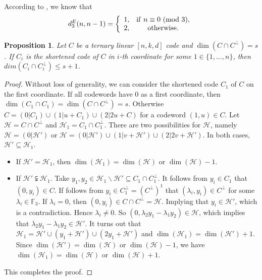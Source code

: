 \documentclass[12pt,twoside]{article}
\newcommand{\F}{\mathbb{F}}
\theoremstyle{plain}
\newtheorem{prop}[theorem]{Proposition}
\theoremstyle{definition}
\theoremstyle{remark}
\begin{document}
According to \cite{AH-TLCD-1-10}, we know that
$$d_3^E(n,n-1)=\left\{
  \begin{array}{cc}
    1,& {\rm if}\ n\equiv 0\ ({\rm mod}\ 3), \\
    2,& {\rm otherwise.} \\
  \end{array}
\right.$$

\begin{prop}\label{prop-ternary}
Let $C$ be a ternary linear $[n,k,d]$ code and $\dim(C\cap C^\perp)=s$. If $C_i$ is the shortened code of $C$ in $i$-th coordinate for some $1\in \{1,\ldots,n\}$, then $dim(C_i\cap C_i^\perp)\leq s+1$.
\end{prop}

\begin{proof}
Without loss of generality, we can consider the shortened code $C_1$ of $C$ on the first coordinate. If all codewords have $0$ as a first coordinate, then $\dim(C_1\cap C_1)=\dim(C\cap C^\perp)=s$.
Otherwise $C=(0|C_1)\cup(1|u+C_1)\cup(2|2u+C)$ for a codeword $(1,u)\in C$.
Let $\mathcal{H}=C\cap C^\perp$ and $\mathcal{H}_1=C_1\cap C_1^\perp$.
There are two possibilities for $\mathcal{H}$, namely $\mathcal{H}=(0|\mathcal{H}')$ or $\mathcal{H}=(0|\mathcal{H}')\cup(1|v+\mathcal{H}')\cup(2|2v+\mathcal{H}')$.
In both cases, $\mathcal{H}'\subseteq\mathcal{H}_1$.
\begin{itemize}
  \item If $\mathcal{H}'=\mathcal{H}_1$, then $\dim(\mathcal{H}_1)=\dim(\mathcal{H})$ or $\dim(\mathcal{H})-1$.
  \item If $\mathcal{H}'\subsetneqq\mathcal{H}_1$. Take $y_1,y_2\in \mathcal{H}_1\backslash \mathcal{H}'\subseteq C_1\cap C_1^\perp$.
      It follows from $y_i\in C_1$ that $(0,y_i)\in C$.
      If follows from $y_i\in C_1^\perp=(C^\perp)^1$ that $(\lambda_i,y_i)\in C^\perp$ for some $\lambda_i\in \F_3$.
      If $\lambda_i=0$, then $(0,y_i)\in C\cap C^\perp=\mathcal{H}$. Implying that $y_i\in \mathcal{H}'$, which is a contradiction. Hence $\lambda_i\neq 0$. So $(0,\lambda_2y_1-\lambda_1y_2)\in \mathcal{H}$, which implies that $\lambda_2y_1-\lambda_1y_2\in \mathcal{H}'$. It turns out that $\mathcal{H}_1=\mathcal{H}'\cup(y_1+\mathcal{H}')\cup(2y_1+\mathcal{H}')$ and $\dim(\mathcal{H}_1)=\dim(\mathcal{H}')+1$.
      Since $\dim(\mathcal{H}')=\dim(\mathcal{H})$ or $\dim(\mathcal{H})-1$, we have $\dim(\mathcal{H}_1)=\dim(\mathcal{H})$ or $\dim(\mathcal{H})+1$.
\end{itemize}
 This completes the proof.
\end{proof}
\end{document}
